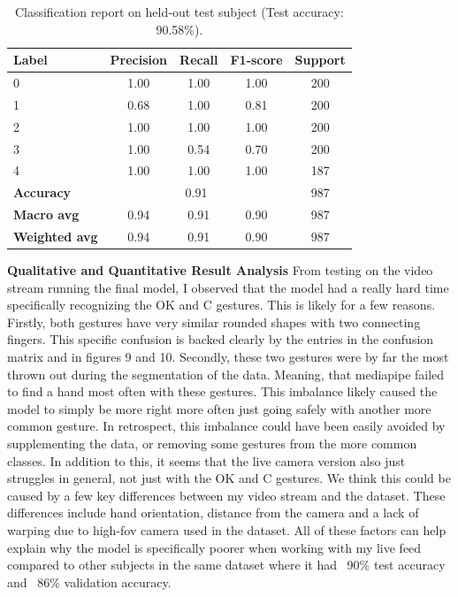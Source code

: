 \documentclass{article}
\begin{document}
\begin{table}
  \centering
  \scriptsize
  \begin{tabular}{l c c c c}
  \hline
  \textbf{Label} & \textbf{Precision} & \textbf{Recall} & \textbf{F1‑score} & \textbf{Support} \\
  \hline
  0           & 1.00 & 1.00 & 1.00 & 200 \\
  1           & 0.68 & 1.00 & 0.81 & 200 \\
  2           & 1.00 & 1.00 & 1.00 & 200 \\
  3           & 1.00 & 0.54 & 0.70 & 200 \\
  4           & 1.00 & 1.00 & 1.00 & 187 \\
  \hline
  \textbf{Accuracy}    & \multicolumn{3}{c}{0.91} & 987 \\
  \textbf{Macro avg}   & 0.94 & 0.91 & 0.90 & 987 \\
  \textbf{Weighted avg}& 0.94 & 0.91 & 0.90 & 987 \\
  \hline
  \end{tabular}
  \caption{Classification report on held‑out test subject (Test accuracy: 90.58\%).}
\end{table}

\medskip
\noindent\textbf{Qualitative and Quantitative Result Analysis}
From testing on the video stream running the final model, I observed that the model 
had a really hard time specifically recognizing the OK and C gestures. This is likely for a few reasons.
Firstly, both gestures have very similar rounded shapes with two connecting fingers. This specific confusion
is backed clearly by the entries in the confusion matrix and in figures 9 and 10. Secondly,
these two gestures were by far the most thrown out during the segmentation of the data. Meaning,
that mediapipe failed to find a hand most often with these gestures. This imbalance likely caused the
model to simply be more right more often just going safely with another more common gesture.
In retrospect, this imbalance could have been easily avoided by supplementing the data, or 
removing some gestures from the more common classes.
In addition to this, it seems that the live camera version also just struggles in general,
not just with the OK and C gestures. We think this could be caused by a few key differences between my video stream and the dataset. These differences include
hand orientation, distance from the camera and a lack of warping due to high-fov camera used in the dataset.
All of these factors can help explain why the model is specifically poorer when working with my live feed compared to other subjects in the same dataset where it had ~90\% test accuracy and ~86\% validation accuracy.
\end{document}
